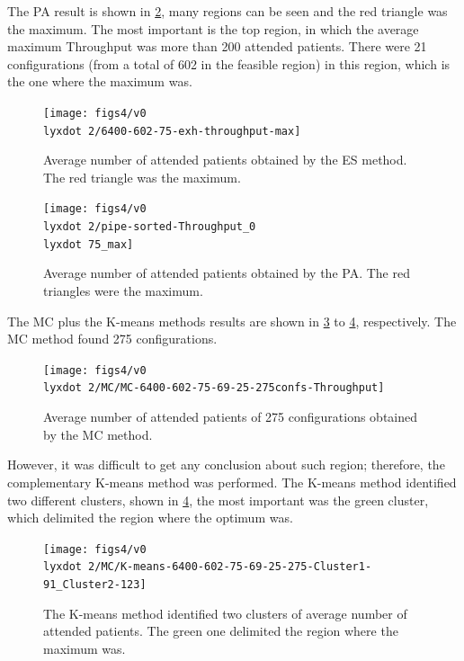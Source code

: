 \documentclass[11pt]{article} %
\begin{document}
The PA result is shown in \ref{subfig:pipe12-2}, many regions can
be seen and the red triangle was the maximum. The most important is
the top region, in which the average maximum Throughput was more than
200 attended patients. There were 21 configurations (from a total
of 602 in the feasible region) in this region, which is the one where
the maximum was.

\begin{figure}[H]
\centering{}\texttt{[image: figs4/v0\\lyxdot 2/6400-602-75-exh-throughput-max]}\caption{Average number of attended patients obtained by the ES method. The
red triangle was the maximum. \label{subfig:es12-2}}
\end{figure}
 
\begin{figure}[H]
\centering{}\texttt{[image: figs4/v0\\lyxdot 2/pipe-sorted-Throughput\_0\\lyxdot 75\_max]}\caption{Average number of attended patients obtained by the PA. The red triangles
were the maximum.\label{subfig:pipe12-2}}
\end{figure}


The MC plus the K-means methods results are shown in \ref{subfig:mc12-2}
to \ref{subfig:km12-2}, respectively. The MC method found 275 configurations.
\begin{figure}[H]
\centering{}\texttt{[image: figs4/v0\\lyxdot 2/MC/MC-6400-602-75-69-25-275confs-Throughput]}\caption{Average number of attended patients of 275 configurations obtained
by the MC method. \label{subfig:mc12-2}}
\end{figure}
 However, it was difficult to get any conclusion about such region;
therefore, the complementary K-means method was performed. The K-means
method identified two different clusters, shown in \ref{subfig:km12-2},
the most important was the green cluster, which delimited the region
where the optimum was.
\begin{figure}[H]
\begin{centering}
\texttt{[image: figs4/v0\\lyxdot 2/MC/K-means-6400-602-75-69-25-275-Cluster1-91\_Cluster2-123]}
\par\end{centering}

\caption{The K-means method identified two clusters of average number of attended
patients. The green one delimited the region where the maximum was.\label{subfig:km12-2}}
\end{figure}
\end{document}
